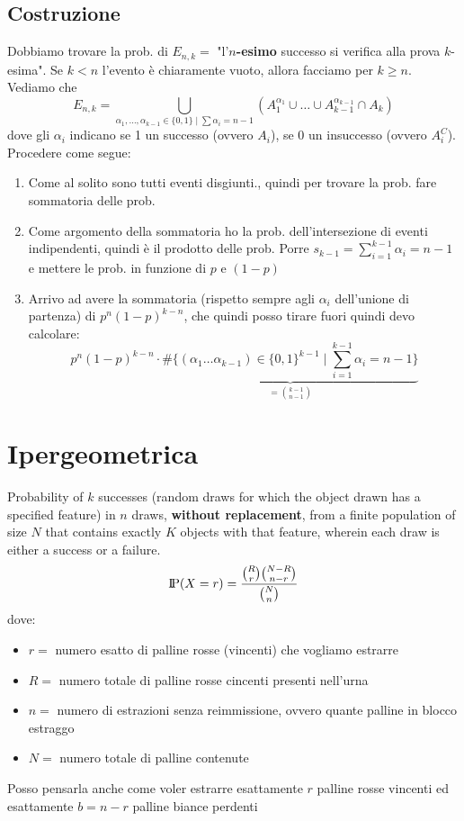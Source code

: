 \documentclass[a4paper,10pt]{article}
\newcommand{\pr}{\text{I\kern-0.15em P}} %
\theoremstyle{remark}
\theoremstyle{definition}
\begin{document}
\subsection*{Costruzione}
Dobbiamo trovare la prob. di $E_{n,k}=$ "l'\textbf{$n$-esimo} successo si verifica alla prova $k$-esima". Se $k<n$ l'evento è chiaramente vuoto, allora facciamo per $k\ge n$. Vediamo che 
$$E_{n,k}=\bigcup_{\alpha_1, \dots,\alpha_{k-1}\in \{0,1\}\mid\sum\alpha_i=n-1}(A_1^{\alpha_1}\cup \dots \cup A_{k-1}^{\alpha_{k-1}}\cap A_k)$$
dove gli $\alpha_i$ indicano se 1 un successo (ovvero $A_i$), se 0 un insuccesso (ovvero $A_i^C$). Procedere come segue:
\begin{enumerate}
    \item Come al solito sono tutti eventi disgiunti., quindi per trovare la prob. fare sommatoria delle prob.
    \item Come argomento della sommatoria ho la prob. dell'intersezione di eventi indipendenti, quindi è il prodotto delle prob. Porre $s_{k-1}=\sum_{i=1}^{k-1}\alpha_i=n-1$ e mettere le prob. in funzione di $p$ e $(1-p)$
    \item Arrivo ad avere la sommatoria (rispetto sempre agli $\alpha_i$ dell'unione di partenza) di $p^n(1-p)^{k-n}$, che quindi posso tirare fuori quindi devo calcolare: 
    $$ p^n(1-p)^{k-n} \cdot \underbrace{\#\{(\alpha_1 \dots \alpha_{k-1})\in\{0,1\}^{k-1}\mid\sum_{i=1}^{k-1}\alpha_i=n-1\}}_{=\binom{k-1}{n-1}}$$
\end{enumerate}



\section{Ipergeometrica}
Probability of $k$ successes (random draws for which the object drawn has a specified feature) in 
$n$ draws, \textbf{without replacement}, from a finite population of size 
$N$ that contains exactly $K$ objects with that feature, wherein each draw is either a success or a failure. 
$$\pr(X=r)=\frac{\binom{R}{r}\binom{N-R}{n-r}}{\binom{N}{n}}$$
dove:
\begin{itemize}
    \item $r=$ numero esatto di palline rosse (vincenti) che vogliamo estrarre
    \item $R=$ numero totale di palline rosse cincenti presenti nell'urna
    \item $n=$ numero di estrazioni senza reimmissione, ovvero quante palline in blocco estraggo 
    \item $N=$ numero totale di palline contenute
\end{itemize}
Posso pensarla anche come voler estrarre esattamente $r$ palline rosse vincenti ed esattamente $b=n-r$ palline biance perdenti
\end{document}
